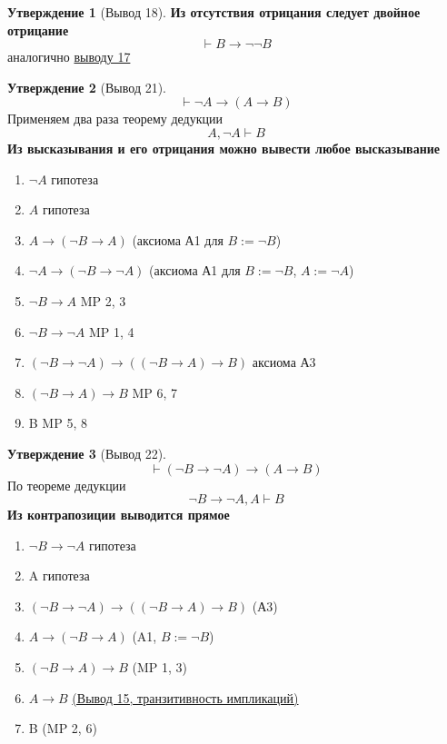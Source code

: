 \documentclass[a4paper]{article}
\theoremstyle{definition}
\newtheorem*{statement}{Утверждение}
\theoremstyle{remark}
\begin{document}
    \begin{statement}[\hypertarget{Вывод 18}{Вывод 18}]
        \textbf{Из отсутствия отрицания следует двойное отрицание}
        $$\vdash B\to \neg \neg B$$
        аналогично \hyperlink{Вывод 17}{выводу 17}
    \end{statement}
    \begin{statement}[\hypertarget{Вывод 21}{Вывод 21}] 
        $$\vdash \neg A \to (A\to B)$$
        Применяем два раза теорему дедукции
        $$A, \neg A\vdash B$$
        \textbf{Из высказывания и его отрицания можно вывести любое высказывание}
        \begin{enumerate}
            \item $\neg A$ гипотеза
            \item $A$ гипотеза
            \item $A\to (\neg B \to A)$ (аксиома А1 для $B := \neg B$)
            \item $\neg A \to (\neg B \to \neg A)$ (аксиома А1 для $B := \neg B$, $A := \neg A$)
            \item $\neg B \to A$ MP 2, 3
            \item $\neg B \to \neg A$ MP 1, 4
            \item $(\neg B \to \neg A) \to ((\neg B \to A) \to B)$ аксиома А3
            \item $(\neg B \to A)\to B$ MP 6, 7
            \item B MP 5, 8
        \end{enumerate}
    \end{statement}
    \begin{statement}[\hypertarget{Вывод 22}{Вывод 22}]
        $$\vdash (\neg B \to \neg A) \to (A\to B)$$
        По теореме дедукции 
        $$\neg B\to \neg A, A\vdash B$$
        \textbf{Из контрапозиции выводится прямое}
        \begin{enumerate}
            \item $\neg B\to \neg A$ гипотеза
            \item A гипотеза
            \item $(\neg B \to \neg A)\to ((\neg B \to A) \to B)$ (А3)
            \item $A\to (\neg B \to A)$ (A1, $B := \neg B$)
            \item $(\neg B \to A) \to B$ (MP 1, 3)
            \item $A\to B$ \hyperlink{Вывод 15}{(Вывод 15, транзитивность импликаций)}
            \item B (MP 2, 6)
        \end{enumerate}
    \end{statement}
\end{document}
